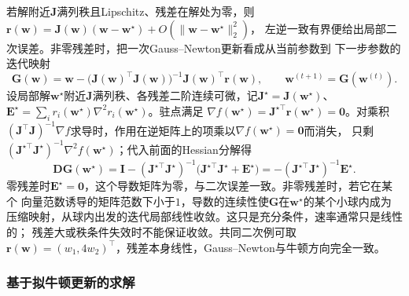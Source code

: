 若解附近$\bm J$满列秩且Lipschitz、残差在解处为零，则
$\bm r(\bm w)=\bm J(\bm w)(\bm w-\bm w^\star)+O(\|\bm w-\bm w^\star\|_2^2)$，
左逆一致有界便给出局部二次误差。非零残差时，把一次Gauss--Newton更新看成从当前参数到
下一步参数的迭代映射
\[
 \bm G(\bm w)=\bm w-\bigl(\bm J(\bm w)^\top\bm J(\bm w)\bigr)^{-1}\bm J(\bm w)^\top\bm r(\bm w),
 \qquad \bm w^{(t+1)}=\bm G(\bm w^{(t)}).
\]
设局部解$\bm w^\star$附近$\bm J$满列秩、各残差二阶连续可微，记$\bm J^\star=\bm J(\bm w^\star)$、
$\bm E^\star=\sum_i r_i(\bm w^\star)\nabla^2r_i(\bm w^\star)$。驻点满足
$\nabla f(\bm w^\star)=\bm J^{\star\top}\bm r(\bm w^\star)=\bm 0$。对乘积
$(\bm J^\top\bm J)^{-1}\nabla f$求导时，作用在逆矩阵上的项乘以$\nabla f(\bm w^\star)=\bm0$而消失，
只剩$(\bm J^{\star\top}\bm J^\star)^{-1}\nabla^2f(\bm w^\star)$；代入前面的Hessian分解得
\[
 \bm D\bm G(\bm w^\star)
 =\bm I-(\bm J^{\star\top}\bm J^\star)^{-1}\bigl(\bm J^{\star\top}\bm J^\star+\bm E^\star\bigr)
 =-(\bm J^{\star\top}\bm J^\star)^{-1}\bm E^\star.
\]
零残差时$\bm E^\star=\bm 0$，这个导数矩阵为零，与二次误差一致。非零残差时，若它在某个
向量范数诱导的矩阵范数下小于$1$，导数的连续性使$\bm G$在$\bm w^\star$的某个小球内成为
压缩映射，从球内出发的迭代局部线性收敛。这只是充分条件，速率通常只是线性的；
残差大或秩条件失效时不能保证收敛。共同二次例可取
$\bm r(\bm w)=(w_1,4w_2)^\top$，残差本身线性，Gauss--Newton与牛顿方向完全一致。

\subsubsection{基于拟牛顿更新的求解}
\label{sec:opt-quasi-newton}


